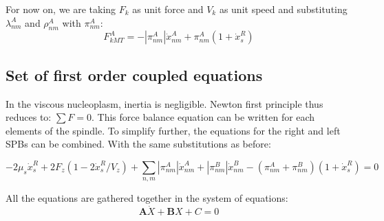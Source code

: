 \documentclass[a4paper,12pt]{article}
\begin{document}
For now on, we are taking $F_k$ as unit force and $V_k$ as unit speed and substituting
$\lambda^A_{nm}$ and $\rho^A_{nm}$ with $\pi_{nm}^A$:
\begin{equation}
    F_{kMT}^A =  - |\pi_{nm}^A|\dot{x}^A_{nm} + \pi_{nm}^A(1 + \dot{x}^R_s)
\end{equation}


\subsection{Set of first order coupled equations}

In the viscous nucleoplasm, inertia is negligible. Newton first
principle thus reduces to: $ \sum F = 0 $. This force balance equation
can be written for each elements of the spindle. 
To simplify further, the equations for the right and left SPBs can be
combined. With the same substitutions as before:

\begin{equation}
  \label{eq:spindle_term}
  - 2\mu_s\dot{x}^R_s + 2F_{z}\left(1 - 2\dot{x}^R_s/V_z\right)%
  + \sum_{n,m}|\pi_{nm}^A|\dot{x}_{nm}^A%
    + |\pi_{nm}^B|\dot{x}_{nm}^B%
    - \left(\pi_{nm}^A + \pi_{nm}^B\right)(1 + \dot{x}^R_s) = 0
\end{equation}

All the equations are gathered together in the system of equations:
$$
\mathbf{A}\dot{X} + \mathbf{B}X + C = 0
$$
\end{document}
